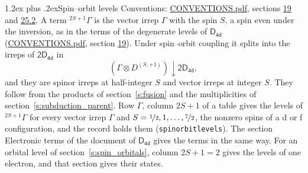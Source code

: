 \documentclass[10pt,a4paper]{article}
\makeatletter
\renewcommand\section{\@startsection{section}{1}{\z@}{-3ex plus -1ex minus -.2ex}%
  {1.2ex plus .2ex}{\normalfont\large\sffamily\bfseries\color{parttitle}}}
\numberwithin{equation}{section}
\newcommand{\grp}[1]{\mathsf{#1}}
\newcommand{\restr}[2]{#1\!\downarrow#2}
\newcommand{\irrJp}[2]{D^{(#1,#2)}}
\newcommand{\irrprod}{\otimes}
\newcommand{\term}[2]{{}^{#1}#2}
\makeatother
\begin{document}
\section{Spin--orbit levels}\label{s:spin_orbit}
Conventions: \href{../../CONVENTIONS.pdf}{CONVENTIONS.pdf}, sections \href{../../../rotation/CONVENTIONS.pdf\#conv.19}{19} and \href{../../CONVENTIONS.pdf\#conv.25.2}{25.2}.
\leavevmode\label{n:local.spin}\label{n:symbol.term}A term $\term{2S+1}{\Gamma}$ is the vector irrep $\Gamma$ with the spin $S$, a spin even under the inversion, as in the terms of the degenerate levels of \href{../../../rotation/data/pdf/D4d.pdf}{$\grp{D_{4d}}$} (\href{../../CONVENTIONS.pdf}{CONVENTIONS.pdf}, section \href{../../../rotation/CONVENTIONS.pdf\#conv.19}{19}). Under spin--orbit coupling it splits into the irreps of $\grp{2D_{4d}}$ in
\begin{equation}\label{e:spinorbit}\restr{(\Gamma \irrprod \irrJp{S}{+1})}{\grp{2D_{4d}}},\end{equation}
and they are spinor irreps at half-integer $S$ and vector irreps at integer $S$. They follow from the products of section~\ref{s:fusion} and the multiplicities of section~\ref{s:subduction_parent}. Row $\Gamma$, column $2S + 1$ of a table gives the levels of $\term{2S+1}{\Gamma}$ for every vector irrep $\Gamma$ and $S = \nicefrac{1}{2}, 1, \dots, \nicefrac{7}{2}$, the nonzero spins of a d or f configuration, and the record holds them (\texttt{spinorbitlevels}). The section Electronic terms of the document of \href{../../../rotation/data/pdf/D4d.pdf}{$\grp{D_{4d}}$} gives the terms in the same way. For an orbital level of section~\ref{s:spin_orbitals}, column $2S + 1 = 2$ gives the levels of one electron, and that section gives their states.
\end{document}
